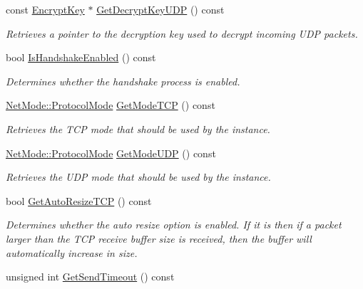 \begin{DoxyCompactItemize}
const \hyperlink{class_encrypt_key}{EncryptKey} $\ast$ \hyperlink{class_net_instance_profile_a67ebfeeeae376870b959b6f6655cf330}{GetDecryptKeyUDP} () const 
\begin{DoxyCompactList}\small\item\em Retrieves a pointer to the decryption key used to decrypt incoming UDP packets. \item\end{DoxyCompactList}\item 
bool \hyperlink{class_net_instance_profile_ac69cc1c6258261af12d7397ecb4e2839}{IsHandshakeEnabled} () const 
\begin{DoxyCompactList}\small\item\em Determines whether the handshake process is enabled. \item\end{DoxyCompactList}\item 
\hyperlink{class_net_mode_a43cfa55ee6a4db66a8d7d6c27f766964}{NetMode::ProtocolMode} \hyperlink{class_net_instance_profile_a33d0b363560c97904e1e1b764f49a5c5}{GetModeTCP} () const 
\begin{DoxyCompactList}\small\item\em Retrieves the TCP mode that should be used by the instance. \item\end{DoxyCompactList}\item 
\hyperlink{class_net_mode_a43cfa55ee6a4db66a8d7d6c27f766964}{NetMode::ProtocolMode} \hyperlink{class_net_instance_profile_a58a1289d1dbd339a1ac58a745f78060c}{GetModeUDP} () const 
\begin{DoxyCompactList}\small\item\em Retrieves the UDP mode that should be used by the instance. \item\end{DoxyCompactList}\item 
bool \hyperlink{class_net_instance_profile_a3138ff491860a299c87cc45f17f193bf}{GetAutoResizeTCP} () const 
\begin{DoxyCompactList}\small\item\em Determines whether the auto resize option is enabled. If it is then if a packet larger than the TCP receive buffer size is received, then the buffer will automatically increase in size. \item\end{DoxyCompactList}\item 
unsigned int \hyperlink{class_net_instance_profile_ad4ed7a0ee24cf165e639fead2ec3e940}{GetSendTimeout} () const 

\end{DoxyCompactItemize}
